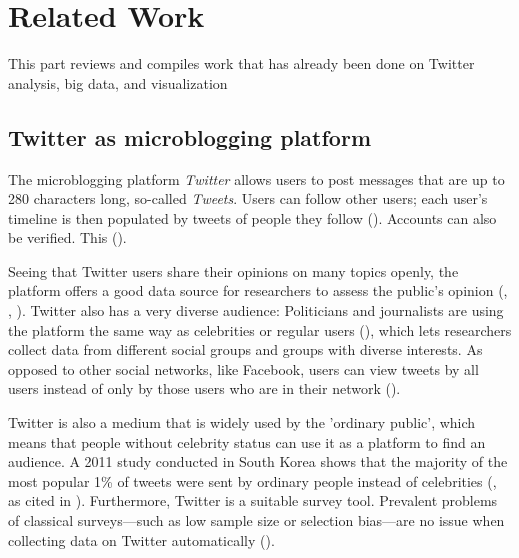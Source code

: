 \section{Related Work}
This part reviews and compiles work that has already been done on Twitter analysis, big data, and visualization

\subsection{Twitter as microblogging platform}
The microblogging platform \emph{Twitter} allows users to post messages that are up to 280 characters long, so-called \emph{Tweets}. Users can follow other users; each user's timeline is then populated by tweets of people they follow (\cite{thimm2012}). Accounts can also be verified. This  (\cite{twitterinc.}). 

Seeing that Twitter users share their opinions on many topics openly, the platform offers a good data source for researchers to assess the public's opinion (\cite{pak2010twitter}, \cite{pfaffenberger2016twitter}, \cite{broniatowski2014twitter}). Twitter also has a very diverse audience: Politicians and journalists are using the platform the same way as celebrities or regular users (\cite{pak2010twitter}), which lets researchers collect data from different social groups and groups with diverse interests. As opposed to other social networks, like Facebook, users can view tweets by all users instead of only by those users who are in their network (\cite{park2013}).

Twitter is also a medium that is widely used by the 'ordinary public', which means that people without celebrity status can use it as a platform to find an audience. A 2011 study conducted in South Korea shows that the majority of the most popular 1\% of tweets were sent by ordinary people instead of celebrities (\cite{chang2011structure}, as cited in \cite{park2013}). Furthermore, Twitter is a suitable survey tool. Prevalent problems of classical surveys---such as low sample size or selection bias---are no issue when collecting data on Twitter automatically (\cite{takabe2016}). 

